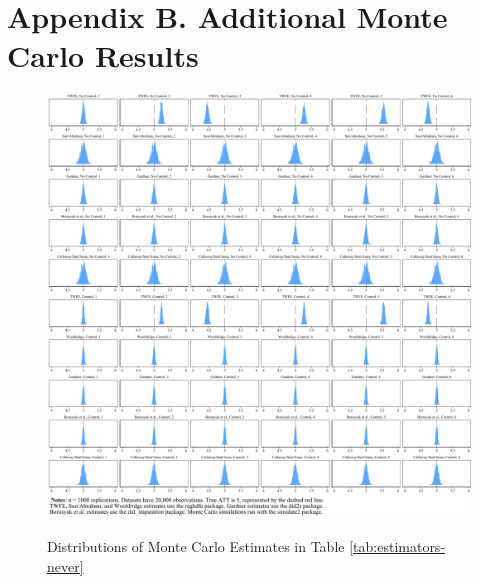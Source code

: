 \documentclass[12pt]{article}
\begin{document}
\section*{Appendix B. Additional Monte Carlo Results} \label{sec:appendixb}

\begin{figure}[H]
    \centering
    \caption{Distributions of Monte Carlo Estimates in Table \ref{tab:estimators-never}}
    \includegraphics[width=6in]{Figures/Histograms of Monte Carlo Estimates 1.jpg}
    \label{fig:hist1}
\end{figure}
\end{document}
